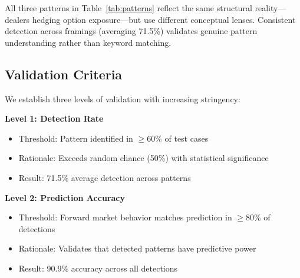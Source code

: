 \begin{table}[h]
\centering
\caption{Three Pattern Framings of Dealer Hedging Constraints}
\label{tab:patterns}
\end{table}

All three patterns in Table~\ref{tab:patterns} reflect the same structural reality—dealers hedging option exposure—but use different conceptual lenses. Consistent detection across framings (averaging 71.5\%) validates genuine pattern understanding rather than keyword matching.

\subsection{Validation Criteria}

We establish three levels of validation with increasing stringency:

\textbf{Level 1: Detection Rate}
\begin{itemize}
\item Threshold: Pattern identified in $\geq$60\% of test cases
\item Rationale: Exceeds random chance (50\%) with statistical significance
\item Result: 71.5\% average detection across patterns
\end{itemize}

\textbf{Level 2: Prediction Accuracy}
\begin{itemize}
\item Threshold: Forward market behavior matches prediction in $\geq$80\% of detections
\item Rationale: Validates that detected patterns have predictive power
\item Result: 90.9\% accuracy across all detections
\end{itemize}

